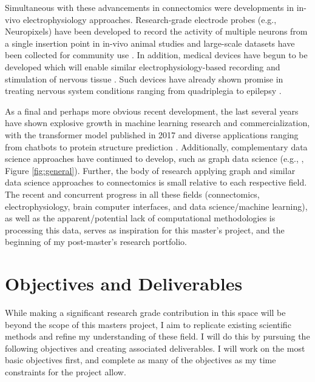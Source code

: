 \documentclass[11pt]{article}
\newcommand{\sectionwithindent}[1]{%
    \section*{#1}%
    \hspace{\parindent} %
}
\begin{document}
Simultaneous with these advancements in connectomics were developments in in-vivo electrophysiology approaches. Research-grade electrode probes (e.g., Neuropixels) have been developed to record the activity of multiple neurons from a single insertion point in in-vivo animal studies \cite{Jun2017, Paulk2022} and large-scale datasets have been collected for community use \cite{Laboratory2022, zhang2025neuralencodingdecodingscale}. In addition, medical devices have begun to be developed which will enable similar electrophysiology-based recording and stimulation of nervous tissue \cite{musk2019integrated, card2024neuroprosthesis, vilela2020bci}. Such devices have already shown promise in treating nervous system conditions ranging from quadriplegia to epilepsy \cite{vilela2020bci, geller2018responsive, Heck2014RNS}.

As a final and perhaps more obvious recent development, the last several years have shown explosive growth in machine learning research and commercialization, with the transformer model published in 2017 \cite{vaswani2023attentionneed} and diverse applications ranging from chatbots to protein structure prediction \cite{Jumper2021, wikipedia2025alphafold}. Additionally, complementary data science approaches have continued to develop, such as graph data science (e.g., \cite{velickovic2018graphattentionnetworks}, Figure \ref{fig:general}). Further, the body of research applying graph and similar data science approaches to connectomics is small relative to each respective field. The recent and concurrent progress in all these fields (connectomics, electrophysiology, brain computer interfaces, and data science/machine learning), as well as the apparent/potential lack of computational methodologies is processing this data, serves as inspiration for this master's project, and the beginning of my post-master's research portfolio.

\sectionwithindent{Objectives and Deliverables}
While making a significant research grade contribution in this space will be beyond the scope of this masters project, I aim to replicate existing scientific methods and refine my understanding of these field. I will do this by pursuing the following objectives and creating associated deliverables. I will work on the most basic objectives first, and complete as many of the objectives as my time constraints for the project allow.
\end{document}
